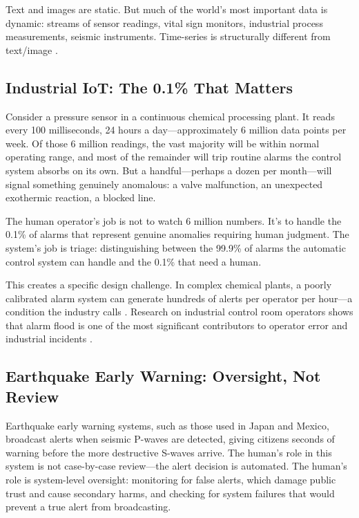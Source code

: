 Text and images are static. But much of the world's most important data is dynamic: streams of sensor readings, vital sign monitors, industrial process measurements, seismic instruments. Time-series \hitl is structurally different from text/image \hitl.

\subsection{Industrial IoT: The 0.1\% That Matters}

Consider a pressure sensor in a continuous chemical processing plant. It reads every 100 milliseconds, 24 hours a day---approximately 6 million data points per week. Of those 6 million readings, the vast majority will be within normal operating range, and most of the remainder will trip routine alarms the control system absorbs on its own. But a handful---perhaps a dozen per month---will signal something genuinely anomalous: a valve malfunction, an unexpected exothermic reaction, a blocked line.

The human operator's job is not to watch 6 million numbers. It's to handle the 0.1\% of alarms that represent genuine anomalies requiring human judgment. The \ai system's job is triage: distinguishing between the 99.9\% of alarms the automatic control system can handle and the 0.1\% that need a human.

This creates a specific design challenge. In complex chemical plants, a poorly calibrated alarm system can generate hundreds of alerts per operator per hour---a condition the industry calls . Research on industrial control room operators shows that alarm flood is one of the most significant contributors to operator error and industrial incidents \autocite{eemua191}.

\subsection{Earthquake Early Warning: Oversight, Not Review}

Earthquake early warning systems, such as those used in Japan and Mexico, broadcast alerts when seismic P-waves are detected, giving citizens seconds of warning before the more destructive S-waves arrive. The human's role in this \hitl system is not case-by-case review---the alert decision is automated. The human's role is system-level oversight: monitoring for false alerts, which damage public trust and cause secondary harms, and checking for system failures that would prevent a true alert from broadcasting.

